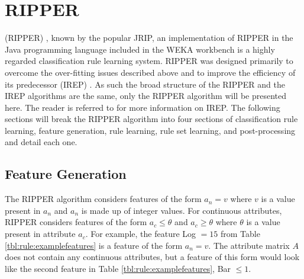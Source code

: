 




\section{RIPPER} \label{chap:rule:ripper}



\RIPPER (RIPPER) \cite{cohen1995ripper}, known by the popular JRIP, an implementation of RIPPER in the Java programming language included in the WEKA workbench \cite{frank2005jrip} is a highly regarded classification rule learning system. RIPPER was designed primarily to overcome the over-fitting issues described above and to improve the efficiency of its predecessor \IREP (IREP) \cite{frnkranz1994irep}. As such the broad structure of the RIPPER and the IREP algorithms are the same, only the RIPPER algorithm will be presented here. The reader is referred to \cite{frnkranz1994irep} for more information on IREP. The following sections will break the RIPPER algorithm into four sections of classification rule learning, feature generation, rule learning, rule set learning, and post-processing and detail each one.

\subsection{Feature Generation}
The RIPPER algorithm considers features of the form $a_n = v$ where $v$ is a value present in $a_n$ and $a_n$ is made up of integer values. For continuous attributes, RIPPER considers features of the form $a_c \leq \theta$ and $a_c \geq \theta$ where $\theta$ is a value present in attribute $a_c$.
For example, the feature Log $= 15$ from Table \ref{tbl:rule:examplefeatures} is a feature of the form $a_n = v$. The attribute matrix $A$ does not contain any continuous attributes, but a feature of this form would look like the second feature in Table \ref{tbl:rule:examplefeatures}, Bar $\leq 1$.

